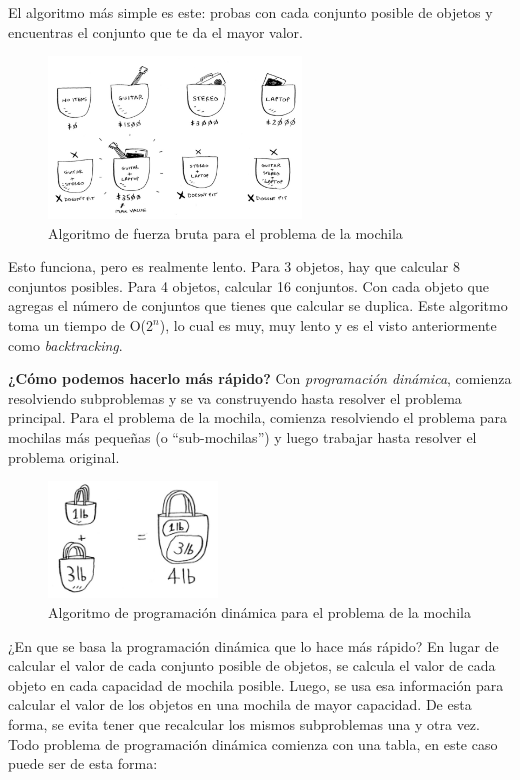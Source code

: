 El algoritmo más simple es este: probas con cada conjunto posible de objetos y encuentras el conjunto que te da el mayor valor.

\begin{figure}[h]
    \centering
    \includegraphics[width=0.6\textwidth]{estáticos/figura12.png}
    \caption{Algoritmo de fuerza bruta para el problema de la mochila}
\end{figure}

Esto funciona, pero es realmente lento. Para 3 objetos, hay que calcular 8 conjuntos posibles. Para 4 objetos, calcular 16 conjuntos. Con cada objeto que agregas el número de conjuntos que tienes que calcular se duplica. Este algoritmo toma un tiempo de O($2^n$), lo cual es muy, muy lento y es el visto anteriormente como \textit{backtracking}.

\newpage
\textbf{¿Cómo podemos hacerlo más rápido?} Con \textit{programación dinámica}, comienza resolviendo subproblemas y se va construyendo hasta resolver el problema principal. Para el problema de la mochila, comienza resolviendo el problema para mochilas más pequeñas (o “sub-mochilas”) y luego trabajar hasta resolver el problema original.

\begin{figure}[h]
    \centering
    \includegraphics[width=0.4\textwidth]{estáticos/figura13.png}
    \caption{Algoritmo de programación dinámica para el problema de la mochila}
\end{figure}

¿En que se basa la programación dinámica que lo hace más rápido? En lugar de calcular el valor de cada conjunto posible de objetos, se calcula el valor de cada objeto en cada capacidad de mochila posible. Luego, se usa esa información para calcular el valor de los objetos en una mochila de mayor capacidad. De esta forma, se evita tener que recalcular los mismos subproblemas una y otra vez. Todo problema de programación dinámica comienza con una tabla, en este caso puede ser de esta forma:

